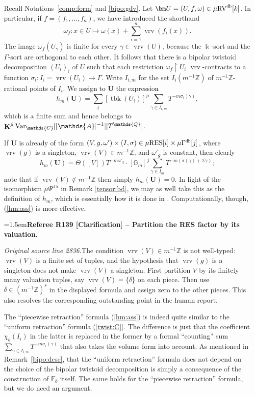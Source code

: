 \documentclass[12pt]{amsart}
\newcommand{\RefereeRemark}[4]{%
  \par\medskip\begingroup\normalfont\small\color{RefereePurple}%
  \emergencystretch=1.5em\noindent\textbf{Referee R#1 [#2] -- #3.}\par\nobreak\noindent #4\par
  \endgroup\medskip
}
\theoremstyle{plain}
\theoremstyle{definition}
\theoremstyle{remark}
\numberwithin{equation}{section}
\theoremstyle{plain}
\newcommand{\RV}{\textup{RV}}
\DeclareMathOperator{\K}{\mathds{k}}
\newcommand{\Z}{\mathds{Z}}
\newcommand{\A}{\mathds{A}}
\newcommand{\C}{\mathds{C}}
\newcommand{\G}{\mathds{G}}
\newcommand{\Q}{\mathds{Q}}
\newcommand{\0}{\emptyset}
\newcommand{\bb}[1]{\mathbb{#1}}
\newcommand{\rest}{\upharpoonright}
\newcommand{\fun}{\longrightarrow}
\newcommand{\efun}{\longmapsto}
\newcommand{\mgRV}{{\mu}{\RV}}
\newcommand{\mG}{{\mu}{\Gamma}}
\newcommand{\RES}{\textup{RES}}
\newcommand{\mgRES}{{\mu}{\RES}}
\DeclareMathOperator{\ggk}{\mathbf{K}}
\DeclareMathOperator{\vrv}{vrv}
\DeclareMathOperator{\db}{d \! b}
\newcommand{\var}{\textup{Var}}
\DeclareMathOperator{\tbk}{tbk}
\newcommand{\gmv}{\ggk^{\hat \mu}\var_{\C}}
\begin{document}
Recall Notations~\ref{comp:form} and \ref{bipo:gdv}. Let $\bm U = (U, f, \omega) \in \mgRV^{\db}[k]$. In particular, if $f=(f_1,\dots,f_n)$, we have introduced the shorthand
\[
\omega_{f}: x\in U \efun \omega(x)+\sum_{i=1}^n\vrv(f_i(x)).
\]
The image $\omega_f(U_\gamma)$ is finite for every $\gamma \in \vrv(U)$, because the $\K$-sort and the $\Gamma$-sort are orthogonal to each other. It follows that there is a bipolar twistoid decomposition $(U_i)_i$ of $U$ such that each restriction $\omega_f \rest U_i$ $\vrv$-contracts to a function $\sigma_i : I_i = \vrv(U_i) \fun \Gamma$. Write $I_{i,m}$ for the set $I_i(m^{-1}\Z)$ of  $m^{-1}\Z$-rational points of $I_i$. We assign to $\bm U$ the expression
\begin{equation}\label{hm:ass}
  h_m(\bm U) = \sum_i [\tbk(U_i)]^{\hat \mu} \sum_{\gamma \in I_{i,m}} T^{-m \sigma_i(\gamma)},
\end{equation}
which is  a finite sum and hence  belongs to $\gmv[[\A]^{-1}][T^{\Q}]$.

If $\bm U$ is already of the form $(V, g, \omega') \times (I, \sigma) \in \mgRES[i] \times \mG^{\db}[j]$, where $\vrv(g)$ is a singleton, $\vrv(V) \in m^{-1}\Z$, and $\omega'_g$ is constant, then clearly
\[
h_m(\bm U) = \Theta([V])T^{-m\omega'_g} \cdot [\G_m]^{j} \sum_{\gamma \in I_{m}} T^{-m (\sigma(\gamma) + \Sigma \gamma )};
\]
note that if $\vrv(V) \notin m^{-1}\Z$ then simply  $h_m(\bm U) = 0$. In light of the isomorphism ${\mu} \Psi^{\db}$ in Remark \ref{tensor:bd}, we may as well take this as the definition of $h_m$, which is essentially how it is done in \cite[\S~8.2]{hru:loe:lef}. Computationally, though,  (\ref{hm:ass}) is more effective.

\RefereeRemark{139}{Clarification}{Partition the RES factor by its valuation}{%
\textit{Original source line 2836.}\quad The condition $\vrv(V)\in m^{-1}\Z$ is not well-typed: $\vrv(V)$ is a finite set of tuples, and the hypothesis that $\vrv(g)$ is a singleton does not make $\vrv(V)$ a singleton. First partition $V$ by its finitely many valuation tuples, say $\vrv(V)=\{\delta\}$ on each piece. Then use $\delta\in(m^{-1}\Z)^r$ in the displayed formula and assign zero to the other pieces. This also resolves the corresponding outstanding point in the human report.
}


The ``piecewise retraction'' formula (\ref{hm:ass}) is indeed quite similar to the ``uniform retraction'' formula (\ref{twist:C}). The difference is just that the coefficient $\chi_b(I_i)$ in the latter is replaced in the former by a formal ``counting'' sum $\sum_{\gamma \in I_{i,m}} T^{-m \sigma_i(\gamma)}$ that also takes the volume form into account. As mentioned in Remark~\ref{bipo:desc}, that the ``uniform retraction'' formula does not depend on the choice of the bipolar twistoid decomposition is simply a consequence of the construction of $\bb E_b$ itself. The same holds for the ``piecewise retraction'' formula, but we do need an argument.
\end{document}
